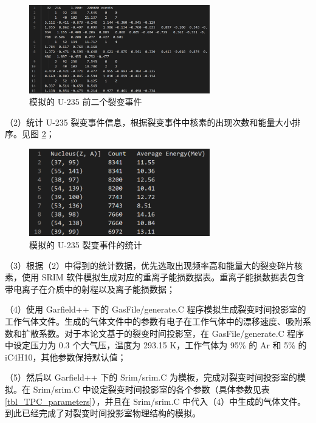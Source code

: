 \documentclass[AutoFakeBold]{LZUThesis}
\begin{document}
\begin{figure}[H]
    \centering
    \includegraphics[width=0.7\textwidth]{figures/U-235-events.png}
    \caption{模拟的 U-235 前二个裂变事件}
    \label{fig_U_235_events}
\end{figure}

（2）统计 U-235 裂变事件信息，根据裂变事件中核素的出现次数和能量大小排序。见图 \ref{fig_statistics}；

\begin{figure}[H]
    \centering
    \includegraphics[width=0.7\textwidth]{figures/statistics.png}
    \caption{模拟的 U-235 裂变事件的统计}
    \label{fig_statistics}
\end{figure}

（3）根据（2）中得到的统计数据，优先选取出现频率高和能量大的裂变碎片核素，使用 SRIM 软件模拟生成对应的重离子能损数据表。重离子能损数据表包含带电离子在介质中的射程以及离子能损数据\cite{魏康2019基于GEM工艺的裂变时间投影室中裂变碎片的讨论, ziegler2010srim}；

（4）使用 Garfield++ 下的 GasFile/generate.C 程序模拟生成裂变时间投影室的工作气体文件。生成的气体文件中的参数有电子在工作气体中的漂移速度、吸附系数和扩散系数\cite{闫洋洋2018用于高精度裂变截面测量的时间投影室}。对于本论文基于的裂变时间投影室，在 GasFile/generate.C 程序中设定压力为 0.3 个大气压，温度为 293.15 K，工作气体为 95\% 的 Ar 和 5\% 的 iC4H10，其他参数保持默认值；

（5）然后以 Garfield++ 下的 Srim/srim.C 为模板，完成对裂变时间投影室的模拟。在 Srim/srim.C 中设定裂变时间投影室的各个参数（具体参数见表 \ref{tbl_TPC_parameters}），并且在 Srim/srim.C 中代入（4）中生成的气体文件。到此已经完成了对裂变时间投影室物理结构的模拟。
\end{document}
